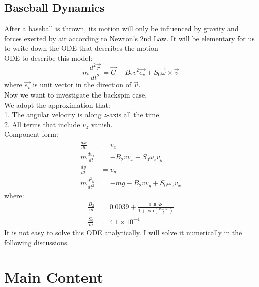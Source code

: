 \documentclass[10pt,a4paper]{article}
\begin{document}
	\subsection{Baseball Dynamics}
	After a baseball is thrown, its motion will only be influenced by gravity and forces exerted by air according to Newton's 2nd Law. It will be elementary for us to write down the ODE that describes the motion\\
	ODE to describe this model:
	\begin{equation}
	m\frac{d^{2}\vec{r}}{dt^2}=\vec{G}-B_{2}v^{2}\vec{e_{v}}+S_{0}\vec{\omega}\times \vec{v}
	\end{equation}
	where $\vec{e_{v}}$ is unit vector in the direction of $\vec{v}$.\\
	Now we want to investigate the backspin case.\\
	We adopt the approximation that:\\
	1. The angular velocity is along $z$-axis all the time.\\
	2. All terms that include $v_z$ vanish.\\
	Component form:
	\begin{align}
	\frac{dx}{dt}&=v_x\\
	m\frac{dv_x}{dt}&=-B_{2}vv_x-S_0\omega_zv_y\\
	\frac{dy}{dt}&=v_y\\
	m\frac{d^{2}y}{dt^{2}}&=-mg-B_{2}vv_y+S_0\omega_zv_x
	\end{align}
	where:
	\begin{align}
	\frac{B_2}{m}&=0.0039+\frac{0.0058}{1+\text{exp}(\frac{v-35}{5})}\\
	\frac{S_0}{m}&=4.1\times 10^{-4}
	\end{align}
	It is not easy to solve this ODE analytically. I will solve it numerically in the following discussions.
	
    \section{Main Content}
\end{document}
